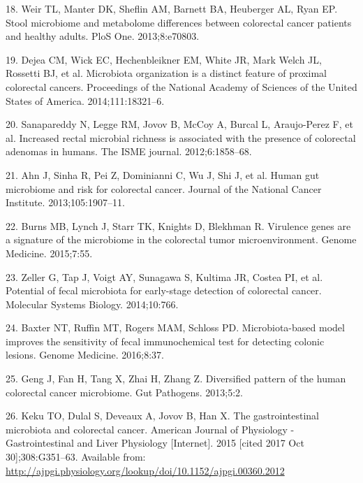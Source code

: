 \documentclass[12pt,]{article}
\begin{document}
\hypertarget{ref-weir_stool_2013}{}
18. Weir TL, Manter DK, Sheflin AM, Barnett BA, Heuberger AL, Ryan EP.
Stool microbiome and metabolome differences between colorectal cancer
patients and healthy adults. PloS One. 2013;8:e70803.

\hypertarget{ref-dejea_microbiota_2014}{}
19. Dejea CM, Wick EC, Hechenbleikner EM, White JR, Mark Welch JL,
Rossetti BJ, et al. Microbiota organization is a distinct feature of
proximal colorectal cancers. Proceedings of the National Academy of
Sciences of the United States of America. 2014;111:18321--6.

\hypertarget{ref-sanapareddy_increased_2012}{}
20. Sanapareddy N, Legge RM, Jovov B, McCoy A, Burcal L, Araujo-Perez F,
et al. Increased rectal microbial richness is associated with the
presence of colorectal adenomas in humans. The ISME journal.
2012;6:1858--68.

\hypertarget{ref-ahn_human_2013}{}
21. Ahn J, Sinha R, Pei Z, Dominianni C, Wu J, Shi J, et al. Human gut
microbiome and risk for colorectal cancer. Journal of the National
Cancer Institute. 2013;105:1907--11.

\hypertarget{ref-burns_virulence_2015}{}
22. Burns MB, Lynch J, Starr TK, Knights D, Blekhman R. Virulence genes
are a signature of the microbiome in the colorectal tumor
microenvironment. Genome Medicine. 2015;7:55.

\hypertarget{ref-zeller_potential_2014}{}
23. Zeller G, Tap J, Voigt AY, Sunagawa S, Kultima JR, Costea PI, et al.
Potential of fecal microbiota for early-stage detection of colorectal
cancer. Molecular Systems Biology. 2014;10:766.

\hypertarget{ref-baxter_microbiota-based_2016}{}
24. Baxter NT, Ruffin MT, Rogers MAM, Schloss PD. Microbiota-based model
improves the sensitivity of fecal immunochemical test for detecting
colonic lesions. Genome Medicine. 2016;8:37.

\hypertarget{ref-geng_diversified_2013}{}
25. Geng J, Fan H, Tang X, Zhai H, Zhang Z. Diversified pattern of the
human colorectal cancer microbiome. Gut Pathogens. 2013;5:2.

\hypertarget{ref-keku_gastrointestinal_2015}{}
26. Keku TO, Dulal S, Deveaux A, Jovov B, Han X. The gastrointestinal
microbiota and colorectal cancer. American Journal of Physiology -
Gastrointestinal and Liver Physiology {[}Internet{]}. 2015 {[}cited 2017
Oct 30{]};308:G351--63. Available from:
\url{http://ajpgi.physiology.org/lookup/doi/10.1152/ajpgi.00360.2012}
\end{document}
